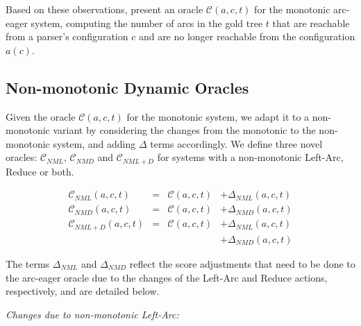 \documentclass[11pt,letterpaper]{article}
\begin{document}
Based on these observations, \citet{goldberg:12} present an oracle
$\mathcal{C}(a,c,t)$ for the monotonic arc-eager system, computing the number
of arcs in the gold tree $t$ that are reachable from a parser's configuration
$c$ and are no longer reachable from the configuration $a(c)$.

\subsection{Non-monotonic Dynamic Oracles}

Given the oracle $\mathcal{C}(a,c,t)$ for the monotonic system,
we adapt it to a non-monotonic variant by considering the changes from the
monotonic to the non-monotonic system, and adding $\Delta$ terms accordingly.
We define three novel oracles: $\mathcal{C}_{NML}$, $\mathcal{C}_{NMD}$ and
$\mathcal{C}_{NML+D}$ for systems with a non-monotonic Left-Arc, Reduce or both.

\[\begin{array}{lcll} 
\mathcal{C}_{NML}(a,c,t)& = &\mathcal{C}(a,c,t)&+ \Delta_{NML}(a,c,t)\\
\mathcal{C}_{NMD}(a,c,t)& = &\mathcal{C}(a,c,t)&+ \Delta_{NMD}(a,c,t)\\
\mathcal{C}_{NML+D}(a,c,t)& = &\mathcal{C}(a,c,t)&+ \Delta_{NML}(a,c,t)\\ 
                                     &  & &+ \Delta_{NMD}(a,c,t)
\end{array}\]

The terms $\Delta_{NML}$ and $\Delta_{NMD}$ reflect the score adjustments that
need to be done to the arc-eager oracle due to the changes of the Left-Arc and
Reduce actions, respectively, and are detailed below.

\noindent \emph{Changes due to non-monotonic Left-Arc:}
\end{document}
